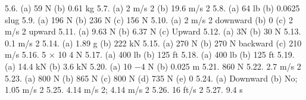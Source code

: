 5.6. (a) 59 N (b) 0.61 kg
5.7. (a) 2 m/s 2 (b) 19.6 m/s 2
5.8. (a) 64 lb (b) 0.0625 slug
5.9. (a) 196 N (b) 236 N (c) 156 N
5.10. (a) 2 m/s 2 downward (b) 0 (c) 2 m/s 2 upward
5.11. (a) 9.63 N (b) 6.37 N (c) Upward
5.12. (a) 3N (b) 30 N
5.13. 0.1 m/s 2
5.14. (a) 1.89 g (b) 222 kN
5.15. (a) 270 N (b) 270 N backward (c) 210 m/s
5.16. 5 × 10 4 N
5.17. (a) 400 lb (b) 125 ft
5.18. (a) 400 lb (b) 125 ft
5.19. (a) 14.4 kN (b) 3.6 kN
5.20. (a) 10 −4 N (b) 0.025 m
5.21. 860 N
5.22. 2.7 m/s 2
5.23. (a) 800 N (b) 865 N (c) 800 N (d) 735 N (e) 0
5.24. (a) Downward (b) No; 1.05 m/s 2
5.25. 4.14 m/s 2; 4.14 m/s 2
5.26. 16 ft/s 2
5.27. 9.4 s




\endinput

